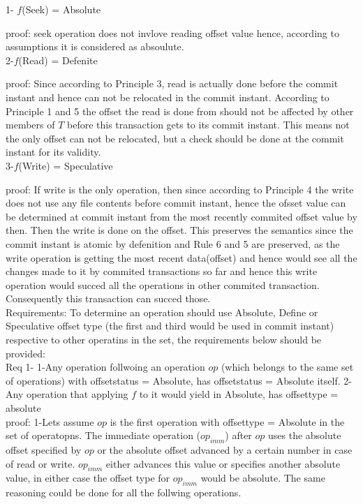 \documentclass[a4paper, 11pt]{article}
\begin{document}
1- $f$(Seek) = Absolute 

proof: seek operation does not invlove reading offset value hence, according to assumptions it is considered as absoulute.\\

2-$f$(Read) = Defenite

proof: Since according to Principle 3, read is actually done before the commit instant and hence can not be relocated in the commit instant. According to Principle 1 and 5 the offset the read is done from should not be affected by other members of $T$ before this transaction gets to its commit instant. This means not the only offset can not be relocated, but a check should be done at the commit instant for its validity.\\

3-$f$(Write) = Speculative

proof: If write is the only operation, then since according to Principle 4 the write does not use any file contents before commit instant, hence the ofsset value can be determined at commit instant from the most recently commited offset value by then. Then the write is done on the offset. This preserves the semantics since the commit instant is atomic by defenition and Rule 6 and 5 are preserved, as the write operation is getting the most recent data(offset) and hence would see all the changes made to it by commited transactions so far and hence this write operation would succed all the operations in other commited transaction. Consequently this transaction can succed those.\\   

Requirements: To determine an operation should use Absolute, Define or Speculative offset type (the first and third would be used in commit instant) respective to other operatins in the set, the requirements below should be provided:\\

Req 1- 1-Any operation follwoing an operation $op$ (which belongs to the same set of operations) with offsetstatus = Absolute, has offsetstatus = Absolute itself. 2-Any operation that applying $f$ to it would yield in Absolute, has offsettype = absolute \\

proof: 1-Lets assume $op$ is the first operation with offsettype = Absolute in the set of operatopns. The immediate operation ($op_{imm}$) after $op$ uses the absolute offset specified by $op$ or the absolute offset advanced by a certain number in case of read or write. $op_{imm}$ either advances this value or specifies another absolute value, in either case the offset type for $op_{imm}$ would be absolute. The same reasoning could be done for all the follwing operations.\\
\end{document}

